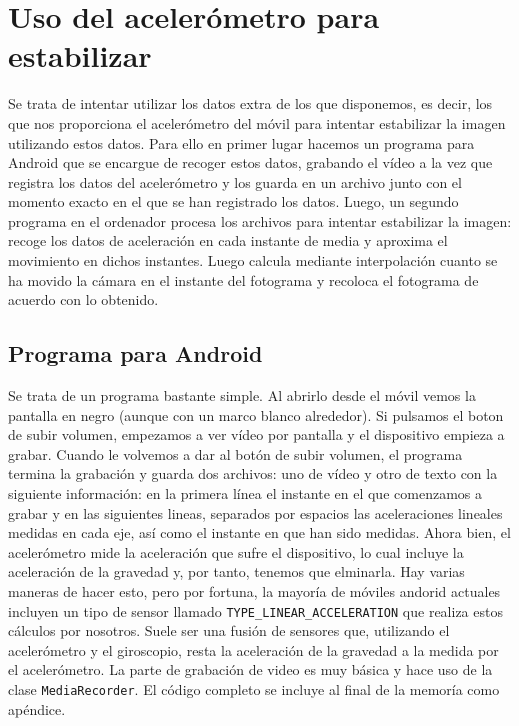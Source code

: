 \documentclass[a4paper,openright, 12pt]{book}
\begin{document}
\section{Uso del acelerómetro para estabilizar}
Se trata de intentar utilizar los datos extra de los que disponemos, es decir, los que nos proporciona el acelerómetro del móvil para intentar estabilizar la imagen utilizando estos datos.
Para ello en primer lugar hacemos un programa para Android que se encargue de recoger estos datos, grabando el vídeo a la vez que registra los datos del acelerómetro y los guarda en un archivo junto con el momento exacto en el que se han registrado los datos.
Luego, un segundo programa en el ordenador procesa los archivos para intentar estabilizar la imagen: recoge los datos de aceleración en cada instante de media y aproxima el movimiento en dichos instantes. Luego calcula mediante interpolación cuanto se ha movido la cámara en el instante del fotograma y recoloca el fotograma de acuerdo con lo obtenido.

\subsection{Programa para Android}
Se trata de un programa bastante simple. Al abrirlo desde el móvil vemos la pantalla en negro (aunque con un marco blanco alrededor). Si pulsamos el boton de subir volumen, empezamos a ver vídeo por pantalla y el dispositivo empieza a grabar. Cuando le volvemos a dar al botón de subir volumen, el programa termina la grabación y guarda dos archivos: uno de vídeo y otro de texto con la siguiente información: en la primera línea el instante en el que comenzamos a grabar y en las siguientes lineas, separados por espacios las aceleraciones lineales medidas en cada eje, así como el instante en que han sido medidas.
Ahora bien, el acelerómetro mide la aceleración que sufre el dispositivo, lo cual incluye la aceleración de la gravedad y, por tanto, tenemos que elminarla. Hay varias maneras de hacer esto, pero por fortuna, la mayoría de móviles andorid actuales incluyen un tipo de sensor llamado \lstinline|TYPE_LINEAR_ACCELERATION| que realiza estos cálculos por nosotros. Suele ser una fusión de sensores que, utilizando el acelerómetro y el giroscopio, resta la aceleración de la gravedad a la medida por el acelerómetro.
La parte de grabación de video es muy básica y hace uso de la clase \lstinline|MediaRecorder|.
El código completo se incluye al final de la memoría como apéndice.
\newpage
\end{document}
